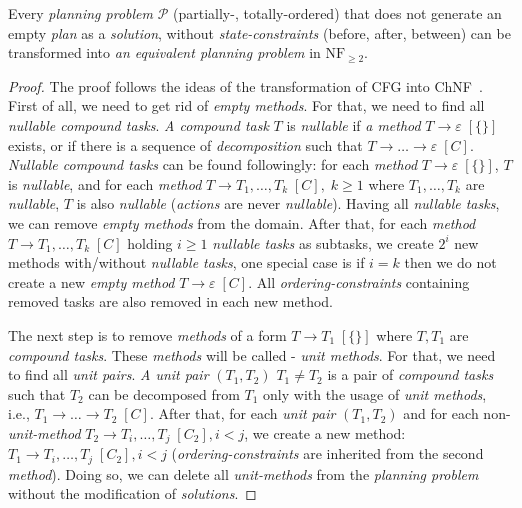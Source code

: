 \begin{thm}\label{thm04:5}
    Every \emph{planning problem} $\mathcal{P}$ (partially-, totally-ordered) that does not generate an empty \emph{plan} as a \emph{solution}, without \emph{state-constraints} (before, after, between) can be transformed into \emph{an equivalent planning problem} in $\text{NF}_{\geq 2}$.
\end{thm}
\begin{proof}
    The proof follows the ideas of the transformation of CFG into ChNF~\cite{langclassification}. First of all, we need to get rid of \emph{empty methods}. For that, we need to find all \emph{nullable compound tasks}. \emph{A compound task} $T$ is \emph{nullable} if \emph{a method} $T \rightarrow \varepsilon \; [\{\}]$ exists, or if there is a sequence of \emph{decomposition} such that $T \rightarrow \dots \rightarrow \varepsilon \; [C]$. \emph{Nullable compound tasks} can be found followingly: for each \emph{method} $T \rightarrow \varepsilon \; [\{\}]$, $T$ is \emph{nullable}, and for each \emph{method} $T \rightarrow T_1, \dots, T_k \; [C], \; k \geq 1$ where $T_1, \dots, T_k$ are \emph{nullable}, $T$ is also \emph{nullable} (\emph{actions} are never \emph{nullable}). Having all \emph{nullable tasks}, we can remove \emph{empty methods} from the domain. After that, for each \emph{method} $T \rightarrow T_1, \dots, T_k \; [C]$ holding $i \geq 1$ \emph{nullable tasks} as subtasks, we create $2^i$ new methods with/without \emph{nullable tasks}, one special case is if $i = k$ then we do not create a new \emph{empty method} $T \rightarrow \varepsilon \; [C]$. All \emph{ordering-constraints} containing removed tasks are also removed in each new method. 
    
    The next step is to remove \emph{methods} of a form $T \rightarrow T_1 \; [\{\}]$ where $T, T_1$ are \emph{compound tasks}. These \emph{methods} will be called - \emph{unit methods}. For that, we need to find all \emph{unit pairs}. \emph{A unit pair} $(T_1, T_2)$ $T_1 \neq T_2$ is a pair of \emph{compound tasks} such that $T_2$ can be decomposed from $T_1$ only with the usage of \emph{unit methods}, i.e., $T_1 \rightarrow \dots \rightarrow T_2 \; [C]$. After that, for each \emph{unit pair} $(T_1, T_2)$ and for each non-\emph{unit-method} $T_2 \rightarrow T_i, \dots, T_j \; [C_2], i < j$, we create a new method: $T_1 \rightarrow T_i, \dots, T_j \; [C_2], i < j$ (\emph{ordering-constraints} are inherited from the second \emph{method}). Doing so, we can delete all \emph{unit-methods} from the \emph{planning problem} without the modification of \emph{solutions}.


\end{proof}

